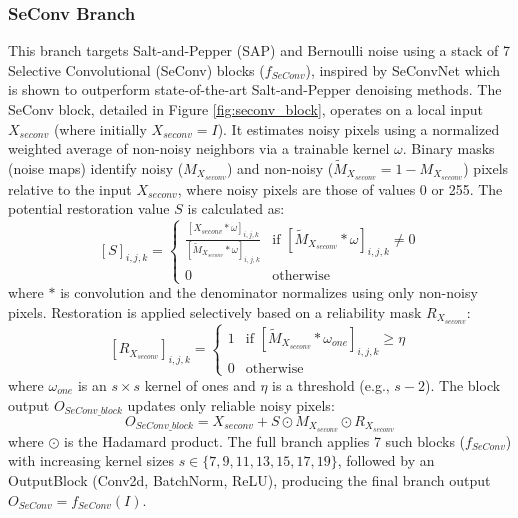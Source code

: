 \subsubsection{SeConv Branch}
This branch targets Salt-and-Pepper (SAP) and Bernoulli noise using a stack of 7 Selective Convolutional (SeConv) blocks ($f_{SeConv}$), inspired by SeConvNet \cite{Rafiee2021} which is shown to outperform state-of-the-art Salt-and-Pepper denoising methods. The SeConv block, detailed in Figure \ref{fig:seconv_block}, operates on a local input $X_{seconv}$ (where initially $X_{seconv}=I$). It estimates noisy pixels using a normalized weighted average of non-noisy neighbors via a trainable kernel $\omega$. Binary masks (noise maps) identify noisy ($M_{X_{seconv}}$) and non-noisy ($\tilde{M}_{X_{seconv}} = 1 - M_{X_{seconv}}$) pixels relative to the input $X_{seconv}$, where noisy pixels are those of values 0 or 255. The potential restoration value $S$ is calculated as:
\begin{equation} \label{eq:seconv_s}
[S]_{i,j,k} = \begin{cases} 
\frac{[X_{seconv} * \omega]_{i,j,k}}{[\tilde{M}_{X_{seconv}} * \omega]_{i,j,k}} & \text{if } [\tilde{M}_{X_{seconv}} * \omega]_{i,j,k} \neq 0 \\ 
0 & \text{otherwise} 
\end{cases}
\end{equation}
where $*$ is convolution and the denominator normalizes using only non-noisy pixels. Restoration is applied selectively based on a reliability mask $R_{X_{seconv}}$:
\begin{equation} \label{eq:seconv_r}
[R_{X_{seconv}}]_{i,j,k} = \begin{cases} 
1 & \text{if } [\tilde{M}_{X_{seconv}} * \omega_{one}]_{i,j,k} \ge \eta \\ 
0 & \text{otherwise} 
\end{cases}
\end{equation}
where $\omega_{one}$ is an $s \times s$ kernel of ones and $\eta$ is a threshold (e.g., $s-2$). The block output $O_{SeConv\_block}$ updates only reliable noisy pixels:
\begin{equation} \label{eq:seconv_output}
O_{SeConv\_block} = X_{seconv} + S \odot M_{X_{seconv}} \odot R_{X_{seconv}} 
\end{equation}
where $\odot$ is the Hadamard product. The full branch applies 7 such blocks ($f_{SeConv}$) with increasing kernel sizes $s \in \{7, 9, 11, 13, 15, 17, 19\}$, followed by an OutputBlock (Conv2d, BatchNorm, ReLU), producing the final branch output $O_{SeConv} = f_{SeConv}(I)$.

